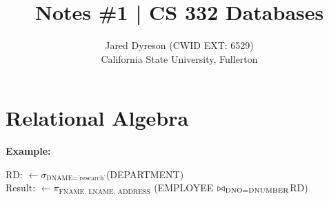 \documentclass{article}
\title{Notes \#1 | CS 332 Databases}
\author{Jared Dyreson (CWID EXT: 6529)\\ 
        California State University, Fullerton}
\date
\DeclareRobustCommand{\bowtie}{%
  \mathrel\triangleright\joinrel\mathrel\triangleleft}
\begin{document}
\maketitle
\tableofcontents

\newpage

\section{Relational Algebra}

\textbf{Example:}

\begin{center}
RD: $\leftarrow \sigma_{\textrm{DNAME='research'}}$(DEPARTMENT) \\ \vspace{5px}
Result: $\leftarrow \pi_{\textrm{FNAME, LNAME, ADDRESS}}$ (EMPLOYEE $\bowtie_{\textrm{DNO=DNUMBER}}$RD)
\end{center}
\end{document}
